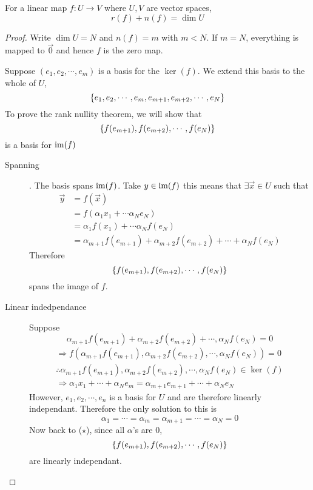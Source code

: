 \documentclass{article}
\numberwithin{equation}{section}
\begin{document}
\begin{thm}
    For a linear map $f: U \rightarrow V$ where $U, V$ are vector spaces,
    \begin{equation}\label{eq:3-9}
        r(f) + n(f) = \dim U
    \end{equation}
\end{thm}
\begin{proof}
    Write $\dim U = N$ and $n(f) = m$ with $m < N$. 
    If $m = N$, everything is mapped to $\vec 0$ and hence $f$ is the zero map.

    Suppose $(e_1, e_2, \cdots, e_m)$ is a basis for the $\ker(f)$. 
    We extend this basis to the whole of $U$, 
    \[
        \left\{ e_1, e_2, \cdots, e_m, e_{m+1}, e_{m+2}, \cdots, e_{N} \right\}  
    \]
    To prove the rank nullity theorem, we will show that
    \[
        \left\{ f(e_{m+1}), f(e_{m+2}), \cdots, f(e_{N}) \right\}
    \]
    is a basis for $\operatorname{im}(f)$
    \begin{description}
        \item[Spanning]. The basis spans $\operatorname{im}(f)$.
        Take $y \in \operatorname{im}(f)$ this means that $\exists \vec x \in U$ such that
        \begin{align*}
            \vec y &= f(\vec x) \\
            &= f(\alpha_1 x_1 + \cdots \alpha_N e_N) \\
            &= \alpha_1f(x_1) + \cdots \alpha_N f(e_N) \\
            &= \alpha_{m+1}f(e_{m+1}) + \alpha_{m+2}f(e_{m+2}) + \cdots + \alpha_Nf(e_{N})
        \end{align*}
        Therefore
        \[
            \left\{ f(e_{m+1}), f(e_{m+2}), \cdots, f(e_{N}) \right\}
        \]
        spans the image of $f$.
        \item[Linear indedpendance] Suppose
        \[
            \alpha_{m+1}f(e_{m+1}) + \alpha_{m+2}f(e_{m+2}) +\cdots, \alpha_Nf(e_{N}) = 0 \tag{$\star$}
        \]
        \begin{align*}
            \Rightarrow f(\alpha_{m+1}f(e_{m+1}), \alpha_{m+2}f(e_{m+2}), \cdots, \alpha_Nf(e_{N})) = 0 \\
            \therefore \alpha_{m+1}f(e_{m+1}), \alpha_{m+2}f(e_{m+2}), \cdots, \alpha_Nf(e_{N}) \in \ker(f) \\
            \Rightarrow \alpha_1 x_1 + \cdots + \alpha_N e_m = \alpha_{m+1}e_{m+1} + \cdots + \alpha_{N}e_{N}
        \end{align*}
        However, $e_1, e_2, \cdots, e_n$ is a basis for $U$ and are therefore linearly independant. 
        Therefore the only solution to this is
        \[
            \alpha_1 = \cdots = \alpha_m = \alpha_{m+1} = \cdots = \alpha_N = 0  
        \]
        Now back to ($\star$), since all $\alpha$'s are $0$, 
        \[
            \left\{ f(e_{m+1}), f(e_{m+2}), \cdots, f(e_{N}) \right\}    
        \]
        are linearly independant.
    \end{description}
\end{proof}
\end{document}
